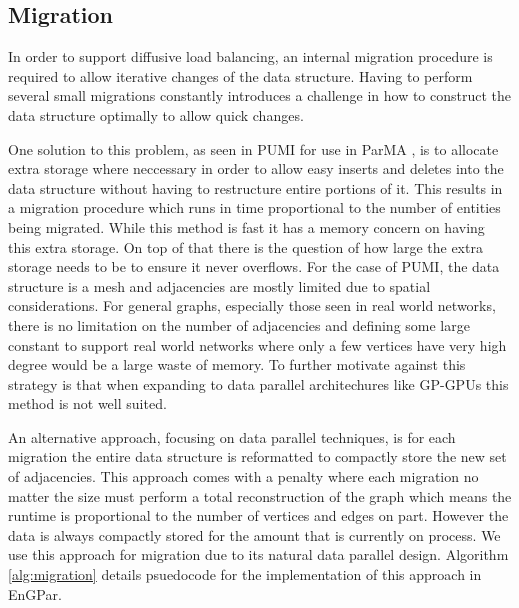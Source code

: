 \documentclass[a4paper]{article}
\begin{document}
\subsection{Migration}
In order to support diffusive load balancing, an internal migration procedure is required to allow iterative changes of the data structure. Having to perform several small migrations constantly introduces a challenge in how to construct the data structure optimally to allow quick changes.

One solution to this problem, as seen in PUMI for use in ParMA \cite{ibanez2016pumi}, is to allocate extra storage where neccessary in order to allow easy inserts and deletes into the data structure without having to restructure entire portions of it. This results in a migration procedure which runs in time proportional to the number of entities being migrated. While this method is fast it has a memory concern on having this extra storage. On top of that there is the question of how large the extra storage needs to be to ensure it never overflows. For the case of PUMI, the data structure is a mesh and adjacencies are mostly limited due to spatial considerations. For general graphs, especially those seen in real world networks, there is no limitation on the number of adjacencies and defining some large constant to support real world networks where only a few vertices have very high degree would be a large waste of memory. To further motivate against this strategy is that when expanding to data parallel architechures like GP-GPUs this method is not well suited.

An alternative approach, focusing on data parallel techniques, is for each migration the entire data structure is reformatted to compactly store the new set of adjacencies. This approach comes with a penalty where each migration no matter the size must perform a total reconstruction of the graph which means the runtime is proportional to the number of vertices and edges on part. However the data is always compactly stored for the amount that is currently on process. We use this approach for migration due to its natural data parallel design. Algorithm \ref{alg:migration} details psuedocode for the implementation of this approach in EnGPar.
\newpage
\end{document}
